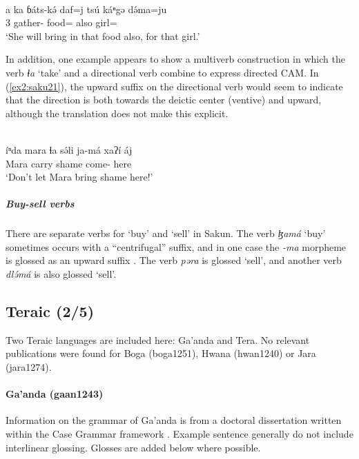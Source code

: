 \ex\label{ex2:saku20}
 \\
\gll a ka ɓáts-kə́ daf=j tsú káⁿgə də́ma=ju \\
 3 gather- food= also  girl= \\
\glt `She will bring in that food also, for that girl.'
\z 

In addition, one example appears to show a multiverb construction in which the verb \textit{ɬa} `take' and a directional verb combine to express directed CAM. In (\ref{ex2:saku21}), the upward suffix on the directional verb would seem to indicate that the direction is both towards the deictic center (ventive) and upward, although the translation does not make this explicit. 

\ea\label{ex2:saku21}
 \\
\gll  íⁿda mara ɬa sə́li ja-má xaʔí áj \\
 Mara carry shame come- here  \\
\glt `Don’t let Mara bring shame here!'
\z 

\subparagraph{Buy-sell verbs}

There are separate verbs for `buy' and `sell' in Sakun. The verb \textit{ɮamá} `buy' sometimes occurs with a ``centrifugal'' suffix, and in one case the \textit{-ma} morpheme is glossed as an upward suffix \citep[210]{thomasGrammarSakunSukur2014}. The verb \textit{pəra} is glossed `sell', and another verb \textit{dlə́má} is also glossed `sell'. 

\subsection{Teraic (2/5)}

Two Teraic languages are included here: Ga'anda and Tera. No relevant publications were found for Boga (boga1251), Hwana (hwan1240) or Jara (jara1274).

\paragraph*{Ga'anda (gaan1243)} \label{gaan}

Information on the grammar of Ga'anda is from a doctoral dissertation written within the Case Grammar framework \citep{newmanCaseGrammarGa1971}. Example sentence generally do not include interlinear glossing. Glosses are added below where possible.

